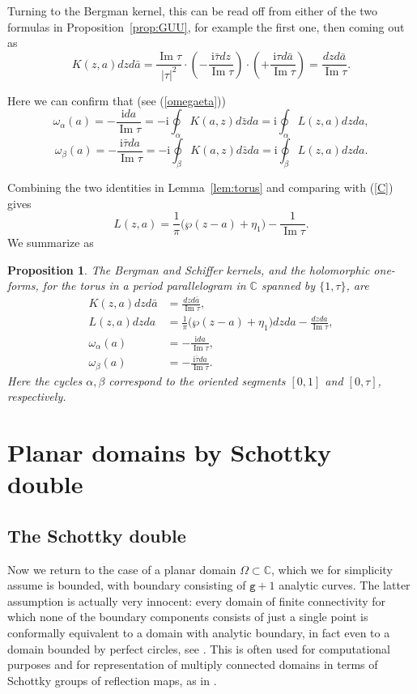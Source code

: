 \documentclass[reqno,12pt]{article}
\theoremstyle{plain}
\newtheorem{proposition}[thm]{Proposition}
\theoremstyle{definition}
\numberwithin{equation}{section}
\numberwithin{figure}{section}
\DeclareMathOperator{\im}{Im}
\def\I{\mathrm{i}}
\def\C{{\mathbb C}}
\begin{document}
Turning to the Bergman kernel, this can be read off  from either of the two formulas in Proposition~\ref{prop:GUU},
for example the first one, then coming out as 
\begin{equation}\label{Ktorus}
K(z,a)dzd\bar{a}=\frac{\im \tau}{|\tau|^2}\cdot (-\frac{\I \bar{\tau}dz}{\im \tau})\cdot (+\frac{\I \tau d\bar{a}}{\im\tau})
=\frac{dzd\bar{a}}{\im\tau}.
\end{equation}

Here we can confirm that (see (\ref{omegaeta}))
$$
\omega_\alpha(a)=-\frac{\I da}{\im \tau}=-\I\oint_\alpha K(a,z)d\bar{z}da=\I \oint_\alpha L(z,a)dzda,
$$
$$
\omega_\beta(a)=-\frac{\I \bar{\tau}da}{\im \tau}=-\I\oint_\beta K(a,z)d\bar{z}da=\I \oint_\beta L(z,a)dzda.
$$

Combining the two identities in Lemma~\ref{lem:torus} and comparing with (\ref{C}) gives
$$
L(z,a)=\frac{1}{\pi}\big(\wp(z-a)+ \eta_1\big)-\frac{1}{ \im \tau}.
$$
We summarize as

\begin{proposition}\label{prop:Lwp}
The Bergman and Schiffer kernels, and the holomorphic one-forms, for the torus in a period parallelogram 
in $\C$ spanned by $\{1,\tau\}$, are
\begin{align*}
K(z,a)dzd\bar{a}&=\frac{dzd\bar{a}}{\im \tau},\\
L(z,a)dzda&=\frac{1}{\pi}\big(\wp(z-a)+ \eta_1\big)dzda-\frac{dzda}{ \im \tau},\\
\omega_\alpha(a)&=-\frac{\I da}{\im \tau},\\
\omega_\beta(a)&=-\frac{\I \bar{\tau}da}{\im \tau}.
\end{align*}
Here the cycles $\alpha, \beta$ correspond to the oriented segments $[0,1]$ and $[0,\tau]$,
respectively.
\end{proposition}


\section{Planar domains by Schottky double}\label{sec:planar domains}

\subsection{The Schottky double}\label{sec:Schottky}

Now we return to the case of a planar domain $\Omega\subset \C$, which we for simplicity assume is bounded, 
with boundary consisting of $\texttt{g}+1$ analytic curves. 
The latter assumption is actually very innocent: every domain of finite connectivity for which none of the boundary components
consists of just a single point is conformally equivalent  to a domain with analytic boundary, in fact even
to a domain bounded by perfect circles, see \cite{Koebe-1918, Nehari-1952}. This is often used for computational
purposes and for representation of multiply connected domains in terms of Schottky groups of reflection maps, as in
\cite{Crowdy-Marshall-2006}.
\end{document}
